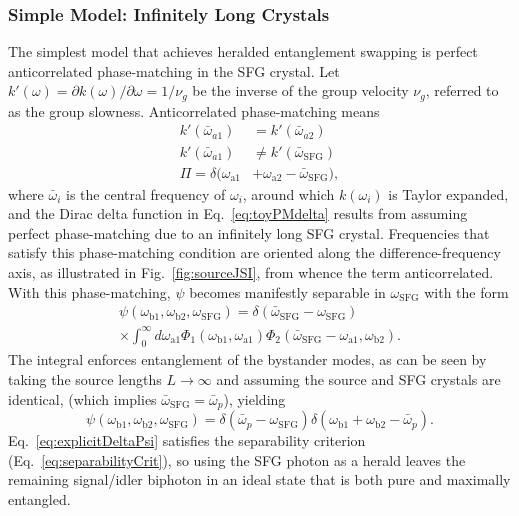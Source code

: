 \documentclass[twocolumn,amssymb, nobibnotes, showpacs, aps, pra,10pt]{revtex4-1}
\newcommand*{\waone}{\omega_{\textrm{a}1}}
\newcommand*{\watwo}{\omega_{\textrm{a}2}}
\newcommand*{\wbone}{\omega_{\textrm{b}1}}
\newcommand*{\wbtwo}{\omega_{\textrm{b}2}}
\newcommand*{\wsfg}{\omega_\textrm{SFG}}
\begin{document}
\subsubsection{Simple Model: Infinitely Long Crystals} \label{sec:toy}
The simplest model that achieves heralded entanglement swapping is perfect anticorrelated phase-matching in the SFG crystal. Let $k'(\omega) = \partial k (\omega)/\partial \omega = 1/ \nu_g$ be the inverse of the group velocity $\nu_g$, referred to as the group slowness. Anticorrelated phase-matching means
\begin{align}
k' (\bar{\omega}_{a1}) &= k' (\bar{\omega}_{a2}) \label{eq:anticorrelated} \\
k' (\bar{\omega}_{a1}) &\neq k' (\bar{\omega}_{\text{SFG}}) \\
\Pi = \delta(\waone& + \watwo - \bar{\omega}_{\text{SFG}}), \label{eq:toyPMdelta}
\end{align}
where $\bar{\omega}_i$ is the central frequency of $\omega_i$, around which $k(\omega_i)$ is Taylor expanded, and the Dirac delta function in Eq.\ \eqref{eq:toyPMdelta} results from assuming perfect phase-matching due to an infinitely long SFG crystal. Frequencies that satisfy this phase-matching condition are oriented along the difference-frequency axis, as illustrated in Fig.\ \ref{fig:sourceJSI}, from whence the term anticorrelated. With this phase-matching, $\psi$ becomes manifestly separable in $\wsfg$ with the form
\begin{equation}
\begin{split} \label{eq:toyEta}
\psi(\wbone,\wbtwo,\wsfg)= \delta (\bar{\omega}_{\text{SFG}} -\omega_{\text{SFG}}) \\
\times \int_0^\infty d\waone \Phi_1 (\wbone, \waone)  \Phi_2 (\bar{\omega}_{\text{SFG}} - \waone, \wbtwo).
\end{split}
\end{equation}
The integral enforces entanglement of the bystander modes, as can be seen by taking the source lengths $L \to \infty$ and assuming the source and SFG crystals are identical, (which implies $\bar{\omega}_{\text{SFG}} = \bar{\omega}_p$), yielding
\begin{equation} \label{eq:explicitDeltaPsi}
\psi (\wbone,\wbtwo,\wsfg) = \delta (\bar{\omega}_{p} -\omega_{\text{SFG}}) \delta(\wbone + \wbtwo - \bar{\omega}_{p}).
\end{equation}
Eq.\ \eqref{eq:explicitDeltaPsi} satisfies the separability criterion (Eq.\ \eqref{eq:separabilityCrit}), so using the SFG photon as a herald leaves the remaining signal/idler biphoton in an ideal state that is both pure and maximally entangled.
\end{document}
